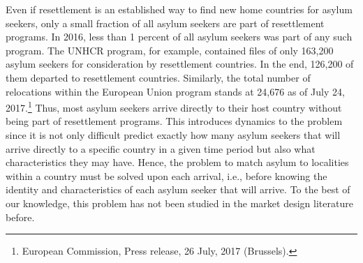 \documentclass[12pt,fleqn]{article}
\begin{document}
Even if resettlement is an established way to find new home countries for asylum seekers, only a small fraction of all asylum seekers are part of resettlement programs. In 2016, less than 1 percent of all asylum seekers was part of any such program. The UNHCR program, for example, contained files of only 163,200 asylum seekers for consideration by resettlement countries. In the end, 126,200 of them departed to resettlement countries. Similarly, the total number of relocations within the European Union program stands at 24,676 as of July 24, 2017.\footnote{European Commission, Press release, 26 July, 2017 (Brussels).} Thus, most asylum seekers arrive directly to their host country without being part of resettlement programs. This introduces dynamics to the problem since it is not only difficult predict exactly how many asylum seekers that will arrive directly to a specific country in a given time period but also what characteristics they may have. Hence, the problem to match asylum to localities within a country must be solved upon each arrival, i.e., before knowing the identity and characteristics of each asylum seeker that will arrive. To the best of our knowledge, this problem has not been studied in the market design literature before.
\end{document}
